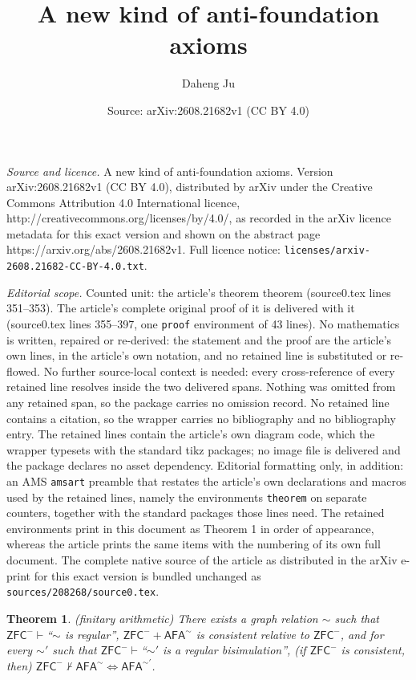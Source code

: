 \documentclass[10pt,a4paper]{amsart}
\title{A new kind of anti-foundation axioms}
\author{Daheng Ju}
\date{Source: arXiv:2608.21682v1 (CC BY 4.0)}
\newtheorem{theorem}{Theorem}
\newcommand{\afa}{\mathsf{AFA}}
\newcommand{\zfc}{\mathsf{ZFC}}
\begin{document}
\maketitle

\noindent\emph{Source and licence.} A new kind of anti-foundation axioms. Version arXiv:2608.21682v1 (CC BY 4.0), distributed by arXiv under the Creative Commons Attribution 4.0 International licence, http://creativecommons.org/licenses/by/4.0/, as recorded in the arXiv licence metadata for this exact version and shown on the abstract page https://arxiv.org/abs/2608.21682v1. Full licence notice: \texttt{licenses/arxiv-2608.21682-CC-BY-4.0.txt}.\par\smallskip

\noindent\textit{Editorial scope.} Counted unit: the article's theorem theorem (source0.tex lines 351--353). The article's complete original proof of it is delivered with it (source0.tex lines 355--397, one \texttt{proof} environment of 43 lines). No mathematics is written, repaired or re-derived: the statement and the proof are the article's own lines, in the article's own notation, and no retained line is substituted or re-flowed.  No further source-local context is needed: every cross-reference of every retained line resolves inside the two delivered spans.  Nothing was omitted from any retained span, so the package carries no omission record.  No retained line contains a citation, so the wrapper carries no bibliography and no bibliography entry.  The retained lines contain the article's own diagram code, which the wrapper typesets with the standard tikz packages; no image file is delivered and the package declares no asset dependency.  Editorial formatting only, in addition: an AMS \texttt{amsart} preamble that restates the article's own declarations and macros used by the retained lines, namely the environments \texttt{theorem} on separate counters, together with the standard packages those lines need.  The retained environments print in this document as Theorem 1 in order of appearance, whereas the article prints the same items with the numbering of its own full document.  The complete native source of the article as distributed in the arXiv e-print for this exact version is bundled unchanged as \texttt{sources/208268/source0.tex}.
\begin{theorem}
    (finitary arithmetic) There exists a graph relation $\sim$ such that $\zfc^-\vdash$``$\sim$ is regular'', $\zfc^-+\afa^\sim$ is consistent relative to $\zfc^-$, and for every $\sim'$ such that $\zfc^-\vdash$``$\sim'$ is a regular bisimulation'', (if $\zfc^-$ is consistent, then) $\zfc^-\not\vdash\afa^\sim\Leftrightarrow\afa^{\sim'}$.
\end{theorem}
\end{document}
